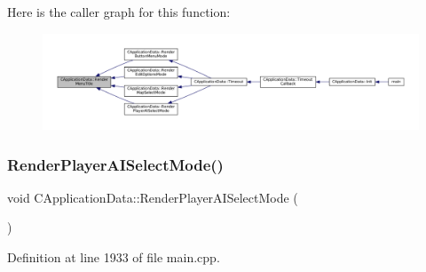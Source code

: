 Here is the caller graph for this function\+:
\nopagebreak
\begin{figure}[H]
\begin{center}
\leavevmode
\includegraphics[width=350pt]{classCApplicationData_a548c5924a281c7e226fd7cac44e59920_icgraph}
\end{center}
\end{figure}
\hypertarget{classCApplicationData_a7d46646402ac95a056456e4a3bb353ed}{}\label{classCApplicationData_a7d46646402ac95a056456e4a3bb353ed} 
\subsubsection{\texorpdfstring{Render\+Player\+A\+I\+Select\+Mode()}{RenderPlayerAISelectMode()}}
{\footnotesize\ttfamily void C\+Application\+Data\+::\+Render\+Player\+A\+I\+Select\+Mode (\begin{DoxyParamCaption}{ }\end{DoxyParamCaption})\hspace{0.3cm}{\ttfamily [protected]}}



Definition at line 1933 of file main.\+cpp.


